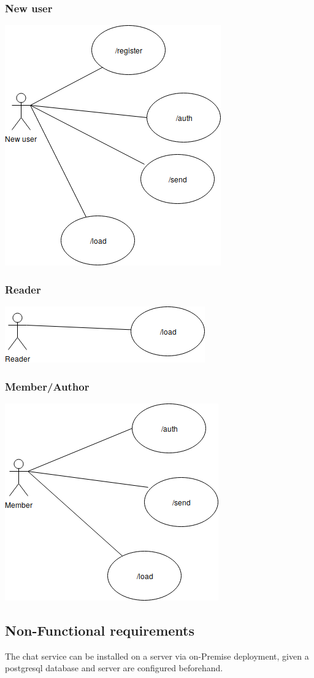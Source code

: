 \documentclass[12pt]{article}
\begin{document}
	\subsubsection{New user}
	\centering
	\includegraphics[width=0.5\linewidth]{NewUser.png}
	\flushleft
	\subsubsection{Reader}
	\centering
	\includegraphics[width=0.5\linewidth]{Reader.png}
	\flushleft
	\subsubsection{Member/Author}
	\centering
	\includegraphics[width=0.5\linewidth]{Member.png}
	\flushleft
	\subsection{Non-Functional requirements}
	The chat service can be installed on a server via on-Premise deployment, given a postgresql database and server are configured beforehand.
\end{document}
